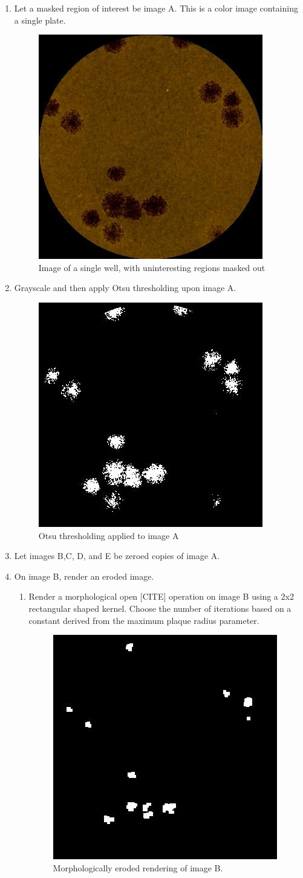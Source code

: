 \documentclass[11pt,final,twocolumn]{IEEEtran}
\begin{document}
\begin{enumerate}
\item Let a masked region of interest be image A. This is a color image containing a single plate.
\begin{figure}[H]
\centering
\includegraphics[width=.25\textwidth]{countBegin.jpg}
\caption{Image of a single well, with uninteresting regions masked out}
\label{fig:countBegin}
\end{figure}


\item Grayscale and then apply Otsu thresholding upon image A.
\begin{figure}[H]
\centering
\includegraphics[width=.25\textwidth]{countOtsuA.jpg}
\caption{Otsu thresholding applied to image A}
\label{fig:countOtsuA}
\end{figure}

\item Let images B,C, D, and E be zeroed copies of image A.
\item On image B, render an eroded image.
\begin{enumerate}
\item
Render a morphological open [CITE] operation on image B using a 2x2  rectangular shaped kernel. Choose the number of iterations based on a constant derived from the maximum plaque radius parameter.
\begin{figure}[H]
\centering
\includegraphics[width=.25\textwidth]{countErodeB.jpg}
\caption{Morphologically eroded rendering of image B.}
\label{fig:countErodeB}
\end{figure}
\end{enumerate}


\end{enumerate}
\end{document}
